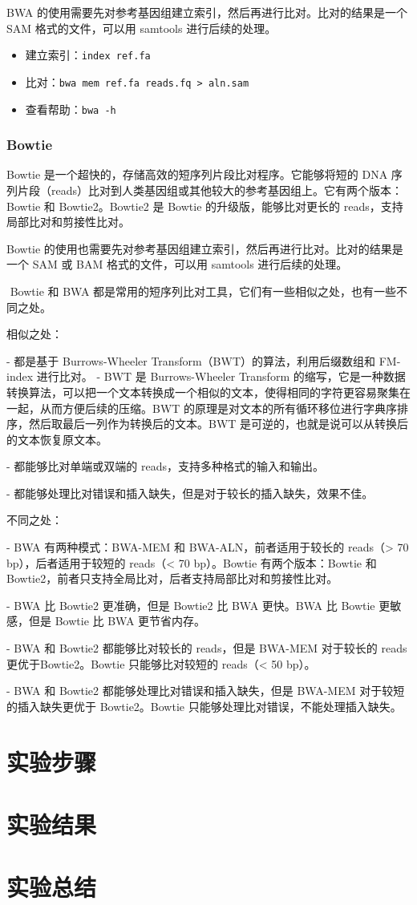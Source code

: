 \documentclass{ctexart}
\begin{document}
    BWA 的使用需要先对参考基因组建立索引，然后再进行比对。比对的结果是一个 SAM 格式的文件，可以用 samtools 进行后续的处理。

    \begin{itemize}
        \item 建立索引：\verb|index ref.fa|
        \item 比对：\verb|bwa mem ref.fa reads.fq > aln.sam|
        \item 查看帮助：\verb|bwa -h|
    \end{itemize}

    \subsubsection{Bowtie} 

    Bowtie 是一个超快的，存储高效的短序列片段比对程序。它能够将短的 DNA 序列片段（reads）比对到人类基因组或其他较大的参考基因组上。它有两个版本：Bowtie 和 Bowtie2。Bowtie2 是 Bowtie 的升级版，能够比对更长的 reads，支持局部比对和剪接性比对。

    Bowtie 的使用也需要先对参考基因组建立索引，然后再进行比对。比对的结果是一个 SAM 或 BAM 格式的文件，可以用 samtools 进行后续的处理。

    ​	Bowtie 和 BWA 都是常用的短序列比对工具，它们有一些相似之处，也有一些不同之处。

相似之处：

- 都是基于 Burrows-Wheeler Transform（BWT）的算法，利用后缀数组和 FM-index 进行比对。
    - BWT 是 Burrows-Wheeler Transform 的缩写，它是一种数据转换算法，可以把一个文本转换成一个相似的文本，使得相同的字符更容易聚集在一起，从而方便后续的压缩。BWT 的原理是对文本的所有循环移位进行字典序排序，然后取最后一列作为转换后的文本。BWT 是可逆的，也就是说可以从转换后的文本恢复原文本。

- 都能够比对单端或双端的 reads，支持多种格式的输入和输出。

- 都能够处理比对错误和插入缺失，但是对于较长的插入缺失，效果不佳。

不同之处：

- BWA 有两种模式：BWA-MEM 和 BWA-ALN，前者适用于较长的 reads（> 70 bp），后者适用于较短的 reads（< 70 bp）。Bowtie 有两个版本：Bowtie 和 Bowtie2，前者只支持全局比对，后者支持局部比对和剪接性比对。

- BWA 比 Bowtie2 更准确，但是 Bowtie2 比 BWA 更快。BWA 比 Bowtie 更敏感，但是 Bowtie 比 BWA 更节省内存。

- BWA 和 Bowtie2 都能够比对较长的 reads，但是 BWA-MEM 对于较长的 reads 更优于Bowtie2。Bowtie 只能够比对较短的 reads（< 50 bp）。

- BWA 和 Bowtie2 都能够处理比对错误和插入缺失，但是 BWA-MEM 对于较短的插入缺失更优于 Bowtie2。Bowtie 只能够处理比对错误，不能处理插入缺失。

    \section{实验步骤}

    \section{实验结果}

    \section{实验总结}
\end{document}

